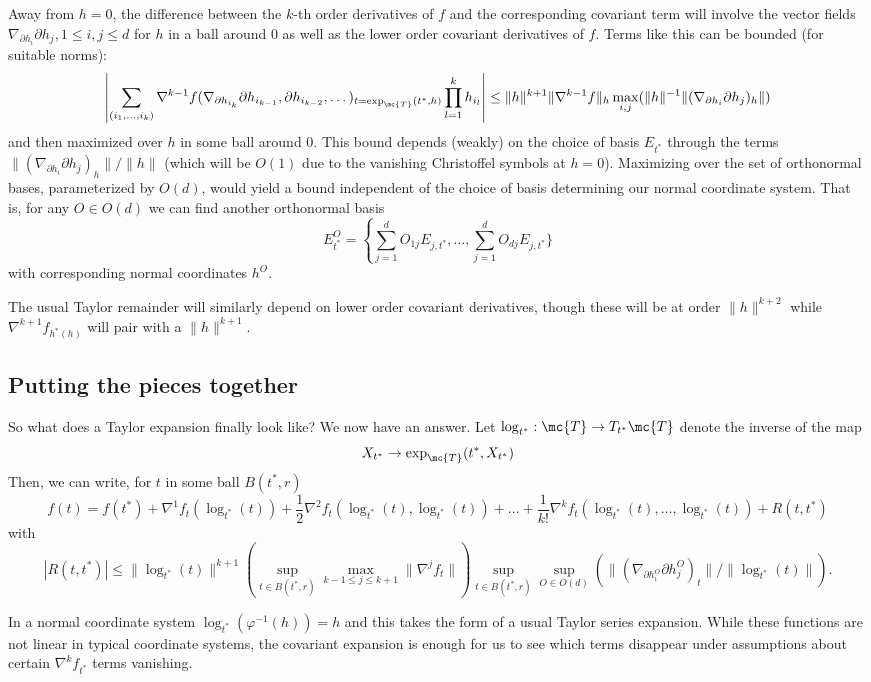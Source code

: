 \documentclass{article}
\begin{document}
Away from $h=0$, the difference between the $k$-th order derivatives of $f$
and the corresponding covariant term will involve 
the vector fields $\nabla_{\partial h_i} \partial h_j, 1 \leq i,j \leq d$ for $h$ in a ball around 0 as well as the lower order covariant derivatives of $f$. Terms like this can be bounded (for suitable norms):
$$
\left|\sum_{(i_1,\dots,i_k)} \nabla^{k-1} f(\nabla_{\partial h_{i_k}}\partial h_{i_{k-1}}, \partial h_{i_{k-2}}, \dots)_{t=\exp_{\mc{T}}(t^*, h)} \prod_{l=1}^k h_{i_l}\right|
\leq \|h\|^{k+1} \|\nabla^{k-1}f\|_h \max_{i,j} (\|h\|^{-1}\|(\nabla_{\partial h_i}\partial h_j)_h\|)
$$
and then maximized over $h$ in some ball around 0. This bound depends (weakly) on the choice of basis $E_{t^*}$ through the terms $\|(\nabla_{\partial h_i}\partial h_j)_h\|/\|h\|$ (which will be $O(1)$ due to
the vanishing Christoffel symbols at $h=0$). Maximizing
over the set of orthonormal bases, parameterized by $O(d)$, would yield a bound independent of the choice of
basis determining our normal
coordinate system. That is, for any $O \in O(d)$ we can find another orthonormal basis
$$
E^O_{t^*} = \left\{\sum_{j=1}^d O_{1j}E_{j,t^*}, \dots, \sum_{j=1}^d O_{dj}E_{j,t^*} \}
$$
with corresponding normal coordinates $h^O$.

The usual Taylor remainder will similarly depend on lower order covariant derivatives, though these will be at order $\|h\|^{k+2}$ while $\nabla^{k+1} f_{h^*(h)}$ will pair with a $\|h\|^{k+1}$.

\subsection{Putting the pieces together}

So what does a Taylor expansion finally look like? We now have an answer. Let $\log_{t^*}:\mc{T} \rightarrow
T_{t^*}\mc{T}$ denote the inverse of the map
$$
X_{t^*} \to \exp_{\mc{T}}(t^*, X_{t^*})
$$
Then, we can write, for $t$ in some ball $B(t^*,r)$
$$
f(t) = f(t^*) + \nabla^1 f_t(\log_{t^*}(t)) + \frac{1}{2} \nabla^2 f_t(\log_{t^*}(t), \log_{t^*}(t))
+ \dots + \frac{1}{k!} \nabla^k f_t(\log_{t^*}(t), \dots, \log_{t^*}(t)) + R(t,t^*)
$$
with
$$
|R(t,t^*)| \leq \|\log_{t^*}(t)\|^{k+1} \left(\sup_{t \in B(t^*,r)} \max_{k-1 \leq j \leq k+1} \|\nabla^j f_t\|\right)
\sup_{t \in B(t^*,r)} \sup_{O \in O(d)} (\|(\nabla_{\partial h_i^O}\partial h_j^O)_t\| / \|\log_{t^*}(t)\|).
$$

In a normal coordinate system $\log_{t^*}(\varphi^{-1}(h))=h$ and this takes the form of a usual Taylor series expansion. While these functions are not linear in typical coordinate systems, the covariant expansion is enough for
us to see which terms disappear under assumptions about certain $\nabla^k f_{t^*}$ terms vanishing.
\end{document}
